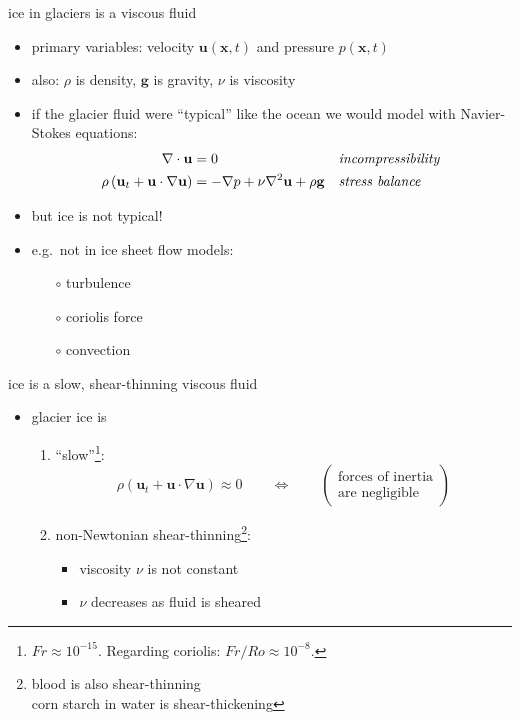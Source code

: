 \documentclass[hide notes,intlimits]{beamer}
\newcommand{\bx}{\mathbf{x}}
\begin{document}
\begin{frame}{ice in glaciers is a viscous fluid}

\begin{itemize}
\item primary variables: velocity $\mathbf{u}(\bx,t)$ and pressure $p(\bx,t)$
\item also: $\rho$ is density, $\mathbf{g}$ is gravity, $\nu$ is viscosity
\item if the glacier fluid were ``typical'' like the ocean we would model with Navier-Stokes equations:
\begin{align*}
\nabla \cdot \mathbf{u} &= 0 &&\text{\emph{incompressibility}} \\
\rho \left(\mathbf{u}_t + \mathbf{u}\cdot\nabla \mathbf{u}\right) &= -\nabla p + \nu \nabla^2 \mathbf{u} + \rho \mathbf{g} &&\text{\emph{stress balance}}
\end{align*}
\item but ice is not typical!
\item e.g.~not in ice sheet flow models:
  \begin{itemize}
  \item[$\circ$] turbulence
  \item[$\circ$] coriolis force
  \item[$\circ$] convection
  \end{itemize}
\end{itemize}
\end{frame}


\begin{frame}{ice is a slow, shear-thinning viscous fluid}

\begin{itemize}
\item glacier ice is
  \begin{enumerate}
  \item ``slow''\footnote{$Fr\approx 10^{-15}$.  Regarding coriolis: $Fr/Ro \approx 10^{-8}$.}:
    $$\rho \left(\mathbf{u}_t + \mathbf{u}\cdot\nabla \mathbf{u}\right) \approx 0 \qquad \iff \qquad \begin{pmatrix} \text{forces of inertia} \\ \text{are negligible} \end{pmatrix}$$
  \item non-Newtonian shear-thinning\footnote{blood is also shear-thinning \\ \hspace{5mm} corn starch in water is shear-thickening}:
    \begin{itemize}
    \item viscosity $\nu$ is not constant
    \item $\nu$ decreases as fluid is sheared
    \end{itemize}
  \end{enumerate}
\end{itemize}
\end{frame}
\end{document}
